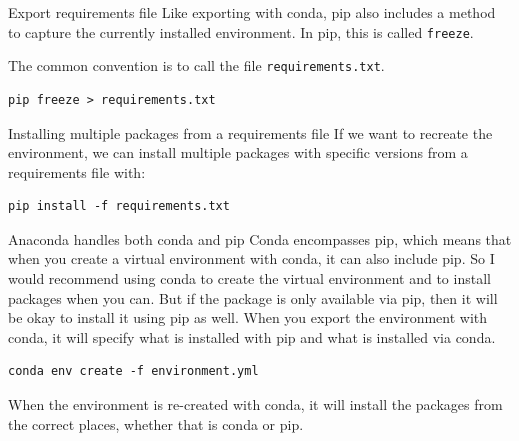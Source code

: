 \documentclass[10pt]{beamer}
\begin{document}
\begin{frame}[label={sec:orgbfe4dab},fragile]{Export requirements file}
 Like exporting with conda, pip also includes a method to capture the currently
installed environment. In pip, this is called \texttt{freeze}.

The common convention is to call the file \texttt{requirements.txt}.

\begin{verbatim}
pip freeze > requirements.txt
\end{verbatim}
\end{frame}

\begin{frame}[label={sec:orge3041a6},fragile]{Installing multiple packages from a requirements file}
 If we want to recreate the environment, we can install multiple packages with
specific versions from a requirements file with:

\begin{verbatim}
pip install -f requirements.txt
\end{verbatim}
\end{frame}

\begin{frame}[label={sec:org0e8ace3},fragile]{Anaconda handles both conda and pip}
 Conda encompasses pip, which means that when you create a virtual environment with
conda, it can also include pip. So I would recommend using conda to create the
virtual environment and to install packages when you can. But if the package is only
available via pip, then it will be okay to install it using pip as well. When you
export the environment with conda, it will specify what is installed with pip and
what is installed via conda.

\begin{verbatim}
conda env create -f environment.yml
\end{verbatim}

When the environment is re-created with conda, it will install the packages from the
correct places, whether that is conda or pip.
\end{frame}
\end{document}

